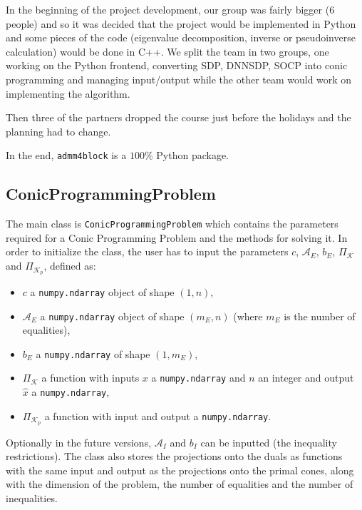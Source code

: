 \documentclass[paper=a4, fontsize=11pt]{scrartcl}
\numberwithin{equation}{section}		%
\numberwithin{figure}{section}			%
\numberwithin{table}{section}				%
\begin{document}
In the beginning of the project development, our group was fairly bigger (6 people) and so it was decided that the project would be implemented in Python and some pieces of the code (eigenvalue decomposition, inverse or pseudoinverse calculation) would be done in C++. We split the team in two groups, one working on the Python frontend, converting SDP, DNNSDP, SOCP into conic programming and managing input/output while the other team would work on implementing the algorithm.

Then three of the partners dropped the course just before the holidays and the planning had to change.

In the end, \texttt{admm4block} is a $100\%$ Python package. 

\subsection{ConicProgrammingProblem}

The main class is \texttt{ConicProgrammingProblem} which contains the parameters required for a Conic Programming Problem and the methods for solving it. In order to initialize the class, the user has to input the parameters $c$, $\mathcal{A}_E$, $b_E$, $\Pi_{\mathcal{K}}$ and $\Pi_{\mathcal{K}_p}$, defined as:

\begin{itemize}
\item $c$ a \texttt{numpy.ndarray} object of shape $(1,n)$,
\item $\mathcal{A}_E$ a \texttt{numpy.ndarray} object of shape $(m_E,n)$ (where $m_E$ is the number of equalities),
\item $b_E$ a \texttt{numpy.ndarray} of shape $(1,m_E)$,
\item $\Pi_{\mathcal{K}}$ a function with inputs $x$ a \texttt{numpy.ndarray} and $n$ an integer and output \\$\hat{x}$ a \texttt{numpy.ndarray},
\item $\Pi_{\mathcal{K}_p}$ a function with input and output a \texttt{numpy.ndarray}.
\end{itemize}

Optionally in the future versions, $\mathcal{A}_I$ and $b_I$ can be inputted (the inequality restrictions).
The class also stores the projections onto the duals as functions with the same input and output as the projections onto the primal cones, along with the dimension of the problem, the number of equalities and the number of inequalities.
\end{document}

